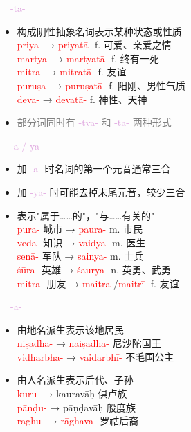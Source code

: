 \documentclass[17pt]{beamer}
\newcommand{\nounstem}[1]{\textcolor{red}{#1\nobreakdash-}}
\newcommand{\fullpada}[1]{\textcolor{OliveGreen}{#1}}
\newcommand{\pratyaya}[1]{\mbox{\textcolor{Plum}{#1}}}
\newcommand{\notsoimportant}[1]{\textcolor{gray}{#1}}
\begin{document}
\begin{frame}{\insertsubsection~~\pratyaya{-tā-}}
  \small
  \begin{itemize}
    \item 构成阴性抽象名词表示某种状态或性质
    \bigskip
    \\ \nounstem{priya} → \nounstem{priyatā} f. 可爱、亲爱之情
    \\ \nounstem{martya} → \nounstem{martyatā} f. 终有一死
    \\ \nounstem{mitra} → \nounstem{mitratā} f. 友谊
    \\ \nounstem{puruṣa} → \nounstem{puruṣatā} f. 阳刚、男性气质
    \\ \nounstem{deva} → \nounstem{devatā} f. 神性、天神
    \bigskip
    \item \notsoimportant{部分词同时有 \pratyaya{-tva-} 和 \pratyaya{-tā-} 两种形式}
  \end{itemize}
\end{frame}


\begin{frame}{\insertsubsection~~\pratyaya{-a-/-ya-}}
  \small
  \begin{itemize}
    \item 加 \pratyaya{-a-} 时名词的第一个元音通常三合
    \item 加 \pratyaya{-ya-} 时可能去掉末尾元音，较少三合
    \item 表示"属于……的"，"与……有关的"
    \bigskip
    \\ \nounstem{pura} 城市 → \nounstem{paura} m. 市民
    \\ \nounstem{veda} 知识 → \nounstem{vaidya} m. 医生
    \\ \nounstem{senā} 军队 → \nounstem{sainya} m. 士兵
    \\ \nounstem{śūra} 英雄 → \nounstem{śaurya} n. 英勇、武勇
    \\ \nounstem{mitra} 朋友 → \nounstem{maitra}/\nounstem{maitrī} f. 友谊
  \end{itemize}
\end{frame}

\begin{frame}{\insertsubsection~~\pratyaya{-a-}}
  \begin{itemize}
    \item 由地名派生表示该地居民  
    \\ \nounstem{niṣadha} → \nounstem{naiṣadha} 尼沙陀国王
    \\ \nounstem{vidharbha} → \nounstem{vaidarbhī} 不毛国公主
    \item 由人名派生表示后代、子孙
    \\ \nounstem{kuru} → \fullpada{kauravāḥ} 俱卢族 
    \\ \nounstem{pāṇḍu} → \fullpada{pāṇḍavāḥ} 般度族
    \\ \nounstem{raghu} → \nounstem{rāghava} 罗祜后裔
  \end{itemize}
\end{frame}
\end{document}
